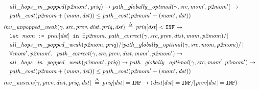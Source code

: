 \begin{equation*}
\begin{split}
&\m{all\_hops\_in\_popped}(\m{p2mom'}, \m{priq}) -> 
\m{path\_globally\_optimal}(\gamma, \m{src}, \m{mom'}, \m{p2mom'}) -> \\
&\m{path\_cost}(\m{p2mom} + \m{(mom, dst)}) \le \m{path\_cost}(\m{p2mom'} + \m{(mom', dst)}) \\
\vspace{1em}
&\!\!\!\!\!\!\m{inv\_unpopped\_weak}(\gamma, \m{src}, \m{prev}, \m{dist}, \m{priq}, \m{dst}) \; \defeq \; \m{priq}[\m{dst}] < \texttt{INF} -> \\
&\texttt{let } \m{mom} \texttt{ := } \m{prev}[\m{dst}] \texttt{ in } \exists \m{p2mom}.~\m{path\_correct}(\gamma, \m{src}, \m{prev}, \m{dist}, \m{mom}, \m{p2mom}) /| \null \\
&\m{all\_hops\_in\_popped\_weak}(\m{p2mom}, \m{priq}) /| \m{path\_globally\_optimal}(\gamma, \m{src}, \m{mom}, \m{p2mom}) /| \null \\
&\forall \m{mom', p2mom'}.~~\m{path\_correct}(\gamma, \m{src}, \m{prev}, \m{dist}, \m{mom'}, \m{p2mom'}) -> \\
&\m{all\_hops\_in\_popped\_weak}(\m{p2mom'}, \m{priq}) -> 
\m{path\_globally\_optimal}(\gamma, \m{src}, \m{mom'}, \m{p2mom'}) -> \\
&\m{path\_cost}(\m{p2mom} + \m{(mom, dst)}) \le \m{path\_cost}(\m{p2mom'} + \m{(mom', dst)}) \\
\vspace{1em}
&\!\!\!\!\!\!\m{inv\_unseen}(\gamma, \m{prev}, \m{dist}, \m{priq}, \m{dst}) \; \defeq \; \m{priq}[\m{dst}] = \texttt{INF} ->
(\m{dist}[\m{dst}] = \texttt{INF} /| \m{prev}[\m{dst}] = \texttt{INF})
\end{split}  
\end{equation*}